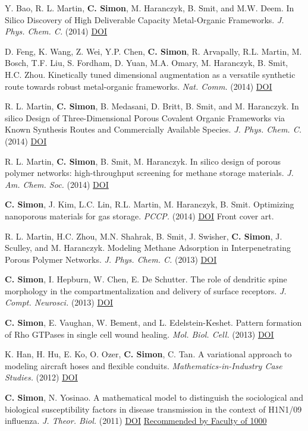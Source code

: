 \documentclass[10pt,a4paper,sans]{moderncv}        %
\begin{document}
\begin{etaremune}[itemsep=0pt]
\item Y. Bao, R. L. Martin, \textbf{C. Simon}, M. Haranczyk, B. Smit, and M.W. Deem. In Silico Discovery of High Deliverable Capacity Metal-Organic Frameworks. \emph{J. Phys. Chem. C.} (2014) \href{http://dx.doi.org/10.1021/jp5123486}{DOI}
\item D. Feng, K. Wang, Z. Wei, Y.P. Chen, \textbf{C. Simon}, R. Arvapally, R.L. Martin, M. Bosch, T.F. Liu, S. Fordham, D. Yuan, M.A. Omary, M. Haranczyk, B. Smit, H.C. Zhou. Kinetically tuned dimensional augmentation as a versatile synthetic route towards robust metal-organic frameworks. \emph{Nat. Comm.} (2014) \href{http://dx.doi.org/10.1038/ncomms6723}{DOI}
\item R. L. Martin, \textbf{C. Simon}, B. Medasani, D. Britt, B. Smit, and M. Haranczyk. In silico Design of Three-Dimensional Porous Covalent Organic Frameworks via Known Synthesis Routes and Commercially Available Species. \emph{J. Phys. Chem. C.} (2014) \href{http://dx.doi.org/10.1021/jp507152j}{DOI}
\item R. L. Martin, \textbf{C. Simon}, B. Smit, M. Haranczyk. In silico design of porous polymer networks: high-throughput screening for methane storage materials. \emph{J. Am. Chem. Soc.} (2014) \href{http://dx.doi.org/10.1021/ja4123939}{DOI}
\item \textbf{C. Simon}, J. Kim, L.C. Lin, R.L. Martin, M. Haranczyk, B. Smit. Optimizing nanoporous materials for gas storage. \emph{PCCP.} (2014) \href{http://dx.doi.org/10.1039/C3CP55039G}{DOI} Front cover art. 
\item R. L. Martin, H.C. Zhou, M.N. Shahrak, B. Smit, J. Swisher, \textbf{C. Simon}, J. Sculley, and M. Haranczyk. Modeling Methane Adsorption in Interpenetrating Porous Polymer Networks. \emph{J. Phys. Chem. C.} (2013) \href{http://dx.doi.org/10.1021/jp406918d}{DOI}
\item \textbf{C. Simon}, I. Hepburn, W. Chen, E. De Schutter. The role of dendritic spine morphology in the compartmentalization and delivery of surface receptors. \emph{J. Compt. Neurosci.} (2013) \href{http://dx.doi.org/10.1007/s10827-013-0482-4}{DOI}
\item \textbf{C. Simon}, E. Vaughan, W. Bement, and L. Edelstein-Keshet. Pattern formation of Rho GTPases in single cell wound healing. \emph{Mol. Biol. Cell.} (2013) \href{http://dx.doi.org/10.1091/mbc.E12-08-0634}{DOI}
\item K. Han, H. Hu, E. Ko, O. Ozer, \textbf{C. Simon}, C. Tan. A variational approach to modeling aircraft hoses and flexible conduits. \emph{Mathematics-in-Industry Case Studies.} (2012) \href{http://www.fields.utoronto.ca/journalarchive/mics/52-35.pdf}{DOI}
\item \textbf{C. Simon}, N. Yosinao. A mathematical model to distinguish the sociological and biological susceptibility factors in disease transmission in the context of H1N1/09 influenza. \emph{J. Theor. Biol.} (2011) \href{http://dx.doi.org/10.1016/j.jtbi.2011.07.008}{DOI} \href{http://f1000.com/prime/13223967}{Recommended by Faculty of 1000}
\end{etaremune}
\end{document}
